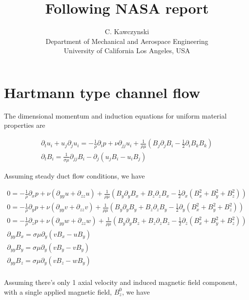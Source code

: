 \documentclass[11pt]{article}
\newcommand{\PD}{\partial}
\begin{document}
\doublespacing
\title{Following NASA report}
\author{C. Kawczynski \\
Department of Mechanical and Aerospace Engineering \\
University of California Los Angeles, USA\\
}
\maketitle

\section{Hartmann type channel flow}

The dimensional momentum and induction equations for uniform material properties are

\begin{equation}\begin{aligned}
\PD_t u_i+u_j\PD_j u_i = -\frac{1}{\rho} \PD_i p+ \nu \PD_{jj} u_i + \frac{1}{\rho \mu} (B_j \PD_j B_i - \tfrac{1}{2} \PD_i B_k B_k) \\
\PD_t B_i = \frac{1}{\sigma \mu} \PD_{jj} B_i - \PD_j (u_j B_i - u_i B_j)
\end{aligned} \end{equation}

Assuming steady duct flow conditions, we have

\begin{equation}\begin{aligned}
0 = -\frac{1}{\rho} \PD_x p + \nu (\PD_{yy} u + \PD_{zz} u) + \frac{1}{\rho \mu} (B_y \PD_y B_x + B_z \PD_z B_x - \tfrac{1}{2} \PD_x (B_x^2+B_y^2+B_z^2)) \\
0 = -\frac{1}{\rho} \PD_y p + \nu (\PD_{yy} v + \PD_{zz} v) + \frac{1}{\rho \mu} (B_y \PD_y B_y + B_z \PD_z B_y - \tfrac{1}{2} \PD_y (B_x^2+B_y^2+B_z^2)) \\
0 = -\frac{1}{\rho} \PD_z p + \nu (\PD_{yy} w + \PD_{zz} w) + \frac{1}{\rho \mu} (B_y \PD_y B_z + B_z \PD_z B_z - \tfrac{1}{2} \PD_z (B_x^2+B_y^2+B_z^2)) \\
\PD_{yy} B_x = \sigma \mu \PD_y (v B_x - u B_y) \\
\PD_{yy} B_y = \sigma \mu \PD_y (v B_y - v B_y) \\
\PD_{yy} B_z = \sigma \mu \PD_y (v B_z - w B_y) \\
\end{aligned} \end{equation}

Assuming there's only 1 axial velocity and induced magnetic field component, with a single applied magnetic field, $B_z^0$, we have
\end{document}
